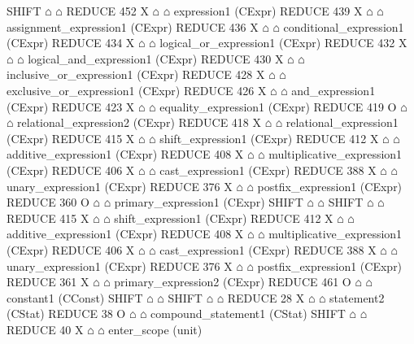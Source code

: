 \begin{isabellebody}
\begin{isamarkuptext}
\begin{isar}
           SHIFT $\house$ $\house$ 
           REDUCE 452 X $\house$ $\house$ expression1  (CExpr) 
            REDUCE 439 X $\house$ $\house$ assignment_expression1  (CExpr) 
             REDUCE 436 X $\house$ $\house$ conditional_expression1  (CExpr) 
              REDUCE 434 X $\house$ $\house$ logical_or_expression1  (CExpr) 
               REDUCE 432 X $\house$ $\house$ logical_and_expression1  (CExpr) 
                REDUCE 430 X $\house$ $\house$ inclusive_or_expression1  (CExpr) 
                 REDUCE 428 X $\house$ $\house$ exclusive_or_expression1  (CExpr) 
                  REDUCE 426 X $\house$ $\house$ and_expression1  (CExpr) 
                   REDUCE 423 X $\house$ $\house$ equality_expression1  (CExpr) 
                    REDUCE 419 O $\house$ $\house$ relational_expression2  (CExpr) 
                     REDUCE 418 X $\house$ $\house$ relational_expression1  (CExpr) 
                      REDUCE 415 X $\house$ $\house$ shift_expression1  (CExpr) 
                       REDUCE 412 X $\house$ $\house$ additive_expression1  (CExpr) 
                        REDUCE 408 X $\house$ $\house$ multiplicative_expression1  (CExpr) 
                         REDUCE 406 X $\house$ $\house$ cast_expression1  (CExpr) 
                          REDUCE 388 X $\house$ $\house$ unary_expression1  (CExpr) 
                           REDUCE 376 X $\house$ $\house$ postfix_expression1  (CExpr) 
                            REDUCE 360 O $\house$ $\house$ primary_expression1  (CExpr) 
                             SHIFT $\house$ $\house$ 
                     SHIFT $\house$ $\house$ 
                     REDUCE 415 X $\house$ $\house$ shift_expression1  (CExpr) 
                      REDUCE 412 X $\house$ $\house$ additive_expression1  (CExpr) 
                       REDUCE 408 X $\house$ $\house$ multiplicative_expression1  (CExpr) 
                        REDUCE 406 X $\house$ $\house$ cast_expression1  (CExpr) 
                         REDUCE 388 X $\house$ $\house$ unary_expression1  (CExpr) 
                          REDUCE 376 X $\house$ $\house$ postfix_expression1  (CExpr) 
                           REDUCE 361 X $\house$ $\house$ primary_expression2  (CExpr) 
                            REDUCE 461 O $\house$ $\house$ constant1  (CConst) 
                             SHIFT $\house$ $\house$ 
           SHIFT $\house$ $\house$ 
           REDUCE 28 X $\house$ $\house$ statement2  (CStat) 
            REDUCE 38 O $\house$ $\house$ compound_statement1  (CStat) 
             SHIFT $\house$ $\house$ 
             REDUCE 40 X $\house$ $\house$ enter_scope  (unit) 

\end{isar}
\end{isamarkuptext}
\end{isabellebody}
